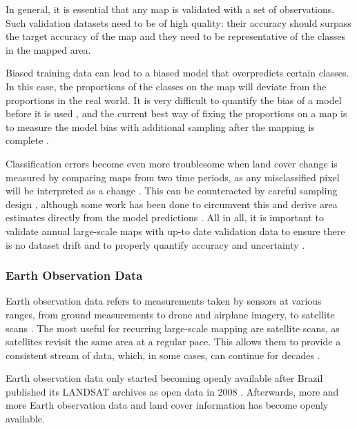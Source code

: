         In general, it is essential that any map is validated with a set of observations. Such validation datasets need to be of high quality: their accuracy should surpass the target accuracy of the map and they need to be representative of the classes in the mapped area.
    
        Biased training data can lead to a biased model that overpredicts certain classes. In this case, the proportions of the classes on the map will deviate from the proportions in the real world. It is very difficult to quantify the bias of a model before it is used \citep{stehman2013estimating}, and the current best way of fixing the proportions on a map is to measure the model bias with additional sampling after the mapping is complete \citep{stehman2014estimating}.

        Classification errors become even more troublesome when land cover change is measured by comparing maps from two time periods, as any misclassified pixel will be interpreted as a change \citep{olofsson2013making}. This can be counteracted by careful sampling design \citep{stehman2012impact,olofsson2014good}, although some work has been done to circumvent this and derive area estimates directly from the model predictions \citep{sales2022land,kleinewillinghofer2022unbiased,angelopoulos2023predictionpowered}.
        All in all, it is important to validate annual large-scale maps with up-to date validation data to ensure there is no dataset drift and to properly quantify accuracy and uncertainty \citep{tsendbazar2021towards}.

    \subsubsection{Earth Observation Data}

        Earth observation data refers to measurements taken by sensors at various ranges, from ground measurements \citep{shahi2015novel} to drone \citep{tang2015drone} and airplane \citep{mastelic2020aerial} imagery, to satellite scans \citep{phiri2020sentinel}. The most useful for recurring large-scale mapping are satellite scans, as satellites revisit the same area at a regular pace. This allows them to provide a consistent stream of data, which, in some cases, can continue for decades \citep{xiong2020modis,wulder2022fifty}.

        Earth observation data only started becoming openly available after Brazil published its LANDSAT archives as open data in 2008 \citep{nature2008markets}. Afterwards, more and more Earth observation data and land cover information has become openly available. 
    
